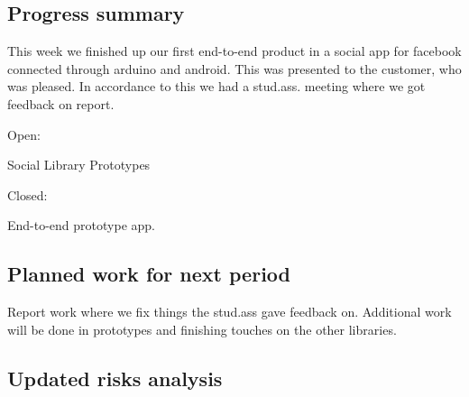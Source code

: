 \subsection{Progress summary}

This week we finished up our first end-to-end product in a social app for facebook connected through arduino and android. This was presented to the customer, who was pleased. In accordance to this we had a stud.ass. meeting where we got feedback on report.


Open:

Social Library
Prototypes

Closed:

End-to-end prototype app.


\subsection{Planned work for next period}

Report work where we fix things the stud.ass gave feedback on. Additional work will be done in prototypes and finishing touches on the other libraries.

\subsection{Updated risks analysis}
